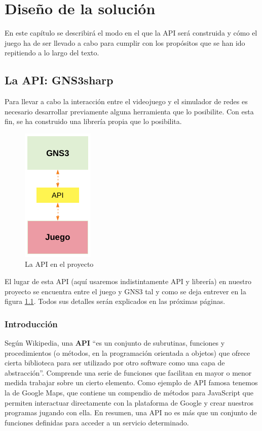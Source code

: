 \chapter{Diseño de la solución}\label{chap:Design}
En este capítulo se describirá el modo en el que la API será construida y cómo el juego ha de ser llevado a cabo para cumplir con los propósitos que se han ido repitiendo a lo largo del texto.

\section{La API: GNS3sharp}\label{sec:dis_api}
Para llevar a cabo la interacción entre el videojuego y el simulador de redes es necesario desarrollar previamente alguna herramienta que lo posibilite. Con esta fin, se ha construido una librería propia que lo posibilita.

\begin{figure}[H]
  \centering
  \includegraphics[scale=1.4]{imagenes/capa_api}
  \caption{La API en el proyecto}
  \label{fig:capa_api}
\end{figure}

El lugar de esta API (aquí usaremos indistintamente API y librería) en nuestro proyecto se encuentra entre el juego y GNS3 tal y como se deja entrever en la figura \ref{fig:capa_api}. Todos sus detalles serán explicados en las próximas páginas.

\subsection{Introducción}
Según Wikipedia, una \textbf{API} ``es un conjunto de subrutinas, funciones y procedimientos (o métodos, en la programación orientada a objetos) que ofrece cierta biblioteca para ser utilizado por otro software como una capa de abstracción''\cite{wiki:api}. Comprende una serie de funciones que facilitan en mayor o menor medida trabajar sobre un cierto elemento. Como ejemplo de API famosa tenemos la de Google Maps, que contiene un compendio de métodos para JavaScript que permiten interactuar directamente con la plataforma de Google y crear nuestros programas jugando con ella\cite{googlemaps}. En resumen, una API no es más que un conjunto de funciones definidas para acceder a un servicio determinado.

